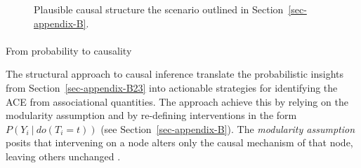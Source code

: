 \documentclass[
  authoryear,
  review,
  1p]{elsarticle}
\makeatletter
\let\oldparagraph\paragraph
\renewcommand{\paragraph}{
    \@ifstar
      \xxxParagraphStar
      \xxxParagraphNoStar
  }
\newcommand{\xxxParagraphStar}[1]{\oldparagraph*{#1}\mbox{}}
\newcommand{\xxxParagraphNoStar}[1]{\oldparagraph{#1}\mbox{}}
\makeatother
\begin{document}
\begin{figure}

\begin{minipage}{0.50\linewidth}

\centering{

\[
\begin{aligned}
  X & := x \\
  T & := f_{T}(x,e_{T}) \\
  Y & := f_{Y}(T,x,e_{Y}) \\
  e_{T} & \:\bot\:e_{X} \\
  e_{T} & \:\bot\:e_{Y} \\
  e_{X} & \:\bot\:e_{Y}
\end{aligned}
\]

}


\end{minipage}%
%
\begin{minipage}{0.50\linewidth}



\end{minipage}%

\caption{\label{fig-example2}Plausible causal structure the scenario
outlined in Section~\ref{sec-appendix-B}.}

\end{figure}%

\paragraph{From probability to causality}\label{sec-appendix-B23}

The structural approach to causal inference translate the probabilistic
insights from Section~\ref{sec-appendix-B23} into actionable strategies
for identifying the ACE from associational quantities. The approach
achieve this by relying on the modularity assumption and by re-defining
interventions in the form \(P(Y_{i} \:|\:do(T_{i}=t))\) (see
Section~\ref{sec-appendix-B}). The \emph{modularity assumption} posits
that intervening on a node alters only the causal mechanism of that
node, leaving others unchanged \citep[pp.~34]{Neal_2020}.
\end{document}
